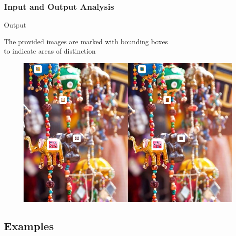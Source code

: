 \documentclass[13.5pt,aspecratio=169, xcolor=dvipsnames]{beamer}
\begin{document}
    
    \begin{frame}
        \onehalfspacing
            \frametitle{Input and Output Analysis}
                \begin{block}{\begin{center}Output\end{center}}
                    \vspace{1em}
                    \begin{center}The provided images are marked with bounding boxes \\ to indicate areas of distinction\end{center}
                    
                    \begin{figure}
                        \centering
                        \includegraphics[scale=0.3]{Example/7_res_full.png}
                    \end{figure}
                \end{block}
        \end{frame}
    
    
    \subsection{Examples}
\end{document}

